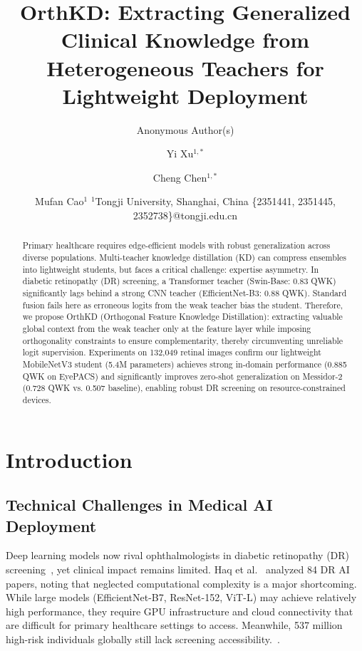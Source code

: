 \documentclass{article}
\title{OrthKD: Extracting Generalized Clinical Knowledge from Heterogeneous Teachers for Lightweight Deployment}
\author{Anonymous Author(s)}
\author{
Yi Xu$^{1,*}$
\and
Cheng Chen$^{1,*}$
\and
Mufan Cao$^1$
\affiliations
$^1$Tongji University, Shanghai, China
\emails
\{2351441, 2351445, 2352738\}@tongji.edu.cn
}
\begin{document}
\maketitle

\begin{abstract}
Primary healthcare requires edge-efficient models with robust generalization across diverse populations. Multi-teacher knowledge distillation (KD) can compress ensembles into lightweight students, but faces a critical challenge: expertise asymmetry. In diabetic retinopathy (DR) screening, a Transformer teacher (Swin-Base: 0.83 QWK) significantly lags behind a strong CNN teacher (EfficientNet-B3: 0.88 QWK). Standard fusion fails here as erroneous logits from the weak teacher bias the student. Therefore, we propose OrthKD (Orthogonal Feature Knowledge Distillation): extracting valuable global context from the weak teacher only at the feature layer while imposing orthogonality constraints to ensure complementarity, thereby circumventing unreliable logit supervision. Experiments on 132,049 retinal images confirm our lightweight MobileNetV3 student (5.4M parameters) achieves strong in-domain performance (0.885 QWK on EyePACS) and significantly improves zero-shot generalization on Messidor-2 (0.728 QWK vs. 0.507 baseline), enabling robust DR screening on resource-constrained devices.
\end{abstract}

\section{Introduction}

\subsection{Technical Challenges in Medical AI Deployment}
Deep learning models now rival ophthalmologists in diabetic retinopathy (DR) screening~\cite{gulshan2016development,zhou2021review}, yet clinical impact remains limited. Haq et al.~\cite{haq2024computationally} analyzed 84 DR AI papers, noting that neglected computational complexity is a major shortcoming. While large models (EfficientNet-B7, ResNet-152, ViT-L) may achieve relatively high performance, they require GPU infrastructure and cloud connectivity that are difficult for primary healthcare settings to access. Meanwhile, 537 million high-risk individuals globally still lack screening accessibility.~\cite{teo2021global}.
\end{document}
